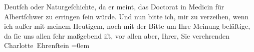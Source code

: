 \begin{ledgroupsized}[t]{13cm}
               Deutſch oder Naturgeſchichte, da er {\pb}meint, das
               Doctorat in Medicin für Albertſchwer zu erringen ſein würde. Und nun bitte ich,
               mir zu verzeihen, wenn ich außer mit meinem Heutigem, noch mit der Bitte um Ihre
               Meinung beläſtige, da ſie uns allen ſehr maßgebend iſt, vor allen aber, Ihrer, Sie \pend
           \pstart
           verehrenden{\\[\baselineskip]}\spacefill\mbox{Charlotte Ehrenſtein}\pend
           \leftskip=0em{}
         
         \endnumbering{}\end{ledgroupsized}  \newcommand{\dateiname}{L01584}\newcommand{\titel}{Charlotte Ehrenstein an Arthur Schnitzler, [Mitte Februar 1906?]}\newcommand{\editorInnen}{Martin Anton Müller und Gerd-Hermann Susen}
      